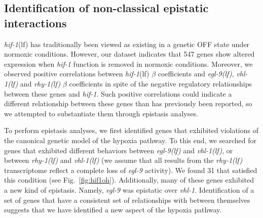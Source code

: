 \documentclass[9pt,twocolumn,twoside]{pnas-new}
\newcommand{\gene}[1]{\emph{#1}}
\newcommand{\egl}{\emph{\mbox{egl-9}(lf)}}
\newcommand{\rhy}{\emph{\mbox{rhy-1}(lf)}}
\newcommand{\vhl}{\emph{\mbox{vhl-1}(lf)}}
\newcommand{\hif}{\emph{\mbox{hif-1}}(lf)}
\newcommand{\hifn}{547}
\newcommand{\hifohtargets}{31}
\begin{document}
\subsection*{Identification of non-classical epistatic interactions}
\label{sub:hifoh}
\hif{} has traditionally been viewed as existing in a genetic OFF state under
normoxic conditions. However, our dataset indicates that \hifn{} genes show
altered expression when \gene{hif-1} function is removed in normoxic conditions.
Moreover, we observed positive correlations between \hif{} $\beta$ coefficients
and \egl{}, \vhl{} and \rhy{} $\beta$ coefficients in spite of the negative
regulatory relationships between these genes and \gene{hif-1}. Such
positive correlations could indicate a different relationship between these genes
than has previously been reported, so we attempted to substantiate them through
epistasis analyses.

To perform epistasis analyses, we first identified genes that exhibited violations
of the canonical genetic model of the hypoxia pathway. To this end, we searched for
genes that exhibited different behaviors between \egl{} and \vhl{}, or
between \rhy{} and \vhl{} (we assume that all results from the
\rhy{} transcriptome reflect a complete loss of \gene{egl-9} activity). We found
\hifohtargets{} that satisfied this condition (see Fig.~\ref{fig:hif1oh}).
Additionally, many of these genes exhibited a new kind of epistasis. Namely,
\gene{egl-9} was epistatic over \gene{vhl-1}. Identification of a set of genes
that have a consistent set of relationships with between themselves suggests that
we have identified a new aspect of the hypoxia pathway.
\end{document}

